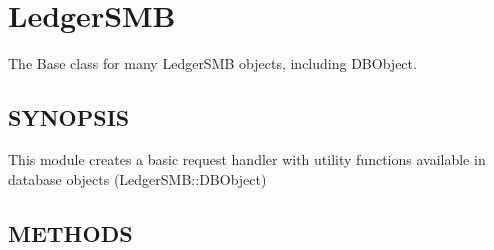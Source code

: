 \section{LedgerSMB\label{LedgerSMB}}


The Base class for many LedgerSMB objects, including DBObject.

\subsection*{SYNOPSIS\label{LedgerSMB_SYNOPSIS}}


This module creates a basic request handler with utility functions available
in database objects (LedgerSMB::DBObject)

\subsection*{METHODS\label{LedgerSMB_METHODS}}
